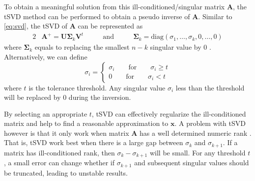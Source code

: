 			To obtain a meaningful solution from this ill-conditioned/singular matrix $\boldsymbol{A}$, the \gls{tSVD} method can be performed to obtain a pseudo inverse of $\boldsymbol{A}$.
			Similar to \cref{eq:svd}, the \gls{tSVD} of $\boldsymbol{A}$ can be represented as 
			\begin{alignat}{2}
				&\boldsymbol{A}^+ = \boldsymbol{U\Sigma}_k\boldsymbol{V}^t  &\qquad\text{and}\qquad  &\boldsymbol{\Sigma}_k=\mathrm{diag}(\sigma_1,\dots,\sigma_k,0,\dots,0)
				\label{eq:tsvd}				
			\end{alignat}
			where $\boldsymbol{\Sigma}_k$ equals to replacing the smallest $n-k$ singular value by 0 \citep{Hansen1987}. 
			Alternatively, we can define
			\begin{equation}
			\sigma_i=\begin{cases}
			\sigma_i\qquad\text{for}\qquad\sigma_i\ge t\\
			0\qquad\text{for}\qquad\sigma_i<t
			\end{cases}
			\end{equation}
			where $t$ is the tolerance threshold. 
			Any singular value $\sigma_i$ less than the threshold will be replaced by 0 during the inversion.
			
			By selecting an appropriate $t$, \gls{tSVD} can effectively regularize the ill-conditioned matrix and help to find a reasonable approximation to $\boldsymbol{x}$. 
			A problem with \gls{tSVD} however is that it only work when matrix $\boldsymbol{A}$ has a well determined numeric rank \citep{Hansen1987}.
			That is, \gls{tSVD} work best when there is a large gap between $\sigma_k$ and $\sigma_{k+1}$.
			If a matrix has ill-conditioned rank, then $\sigma_k-\sigma_{k+1}$ will be small.
			For any threshold $t$, a small error can change whether if $\sigma_{k+1}$ and subsequent singular values should be truncated, leading to unstable results. 
			 
